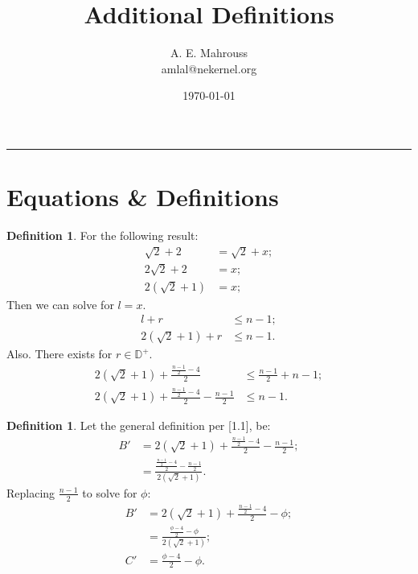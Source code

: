 \documentclass[10pt]{article}
\title{%
	\vspace{-1.5em}%
	\large\textbf{Additional Definitions}%
}
\author{A. E. Mahrouss\\amlal@nekernel.org}
\date{\today}
\theoremstyle{plain}
\theoremstyle{definition}
\newtheorem{definition}[theorem]{Definition}
\theoremstyle{remark}
\begin{document}
	
\maketitle
\vspace{-0.5em}
\vspace{0.8em}
\rule{\linewidth}{0.4pt}
\vspace{1em}
	
	\section{Equations \& Definitions}
	
	\begin{definition}
		For the following result:
		\begin{align*}
			\sqrt{2}+2&=\sqrt{2} + x;\\
			2\sqrt{2}+2 &=x;\\
			2(\sqrt{2} + 1) &= x;
		\end{align*}
		Then we can solve for $l=x.$
		\begin{align*}
			l + r &\leq n - 1;\\
			2(\sqrt{2} + 1) + r &\leq n - 1.
		\end{align*}
		Also. There exists for $r \in \mathbb{D}^{+}.$
		\begin{align*}
			2(\sqrt{2} + 1) + \frac{\frac{n - 1}{2} - 4}{2}  &\leq \frac{n - 1}{2} + n - 1;\\
			2(\sqrt{2} + 1) + \frac{\frac{n - 1}{2} - 4}{2} - \frac{n - 1}{2} &\leq n - 1.
		\end{align*}
	\end{definition}
	
	\begin{definition}
		Let the general definition per [1.1], be:
		\begin{align*}
			B' &= 2(\sqrt{2} + 1) + \frac{\frac{n - 1}{2} - 4}{2} - \frac{n - 1}{2};\\
			&= \frac{\frac{\frac{n - 1}{2} - 4}{2} - \frac{n - 1}{2}}{2(\sqrt{2} + 1)}.
		\end{align*}
		Replacing $\frac{n - 1}{2}$ to solve for $\phi$:
		\begin{align*}
			B' &= 2(\sqrt{2} + 1) + \frac{\frac{n - 1}{2} - 4}{2} - \phi;\\
			&= \frac{\frac{\phi - 4}{2} - \phi}{2(\sqrt{2} + 1)};\\
			C' &= \frac{\phi - 4}{2} - \phi.
		\end{align*}
	\end{definition}
	
\end{document}
